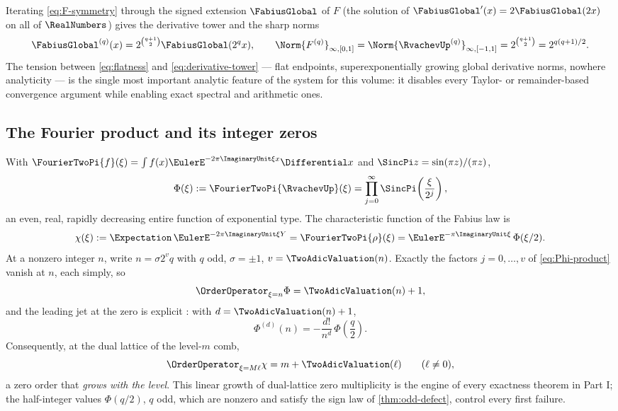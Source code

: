 Iterating \eqref{eq:F-symmetry} through the signed extension
$\FabiusGlobal$ of $F$ (the solution of $\FabiusGlobal'(x)=2\FabiusGlobal(2x)$ on
all of $\RealNumbers$) gives the derivative tower and the sharp norms
\begin{equation}
 \FabiusGlobal^{(q)}(x)=2^{\binom{q+1}{2}}\FabiusGlobal(2^qx),
 \qquad
 \Norm{F^{(q)}}_{\infty,[0,1]}
 =\Norm{\RvachevUp^{(q)}}_{\infty,[-1,1]}
 =2^{\binom{q+1}{2}}=2^{q(q+1)/2}.
 \label{eq:derivative-tower}
\end{equation}
The tension between \eqref{eq:flatness} and
\eqref{eq:derivative-tower} --- flat endpoints, superexponentially
growing global derivative norms, nowhere analyticity --- is the single
most important analytic feature of the system for this volume: it
disables every Taylor- or remainder-based convergence argument while
enabling exact spectral and arithmetic ones.

\subsection{The Fourier product and its integer zeros}
\label{sec:fourier}

With $\FourierTwoPi{f}(\xi)=\int f(x)\EulerE^{-2\pi\ImaginaryUnit\xi x}\Differential x$ and
$\SincPi z=\sin(\pi z)/(\pi z)$,
\begin{equation}
 \Phi(\xi):=\FourierTwoPi{\RvachevUp}(\xi)
 =\prod_{j=0}^{\infty}\SincPi\!\left(\frac{\xi}{2^j}\right),
 \label{eq:Phi-product}
\end{equation}
an even, real, rapidly decreasing entire function of exponential type.
The characteristic function of the Fabius law is
\begin{equation}
 \chi(\xi):=\Expectation\,\EulerE^{-2\pi\ImaginaryUnit\xi Y}
 =\FourierTwoPi{\rho}(\xi)
 =\EulerE^{-\pi\ImaginaryUnit\xi}\,\Phi(\xi/2).
 \label{eq:chi-Phi}
\end{equation}
At a nonzero integer $n$, write $n=\sigma2^{v}q$ with $q$ odd,
$\sigma=\pm1$, $v=\TwoAdicValuation(n)$.  Exactly the factors
$j=0,\dots,v$ of \eqref{eq:Phi-product} vanish at $n$, each simply, so
\begin{equation}
 \OrderOperator_{\xi=n}\Phi=\TwoAdicValuation(n)+1,
 \label{eq:Phi-zero-order}
\end{equation}
and the leading jet at the zero is explicit \cite{ProveItPrimary}:
with $d=\TwoAdicValuation(n)+1$,
\begin{equation}
 \Phi^{(d)}(n)
 =-\frac{d!}{n^{d}}\,\Phi\!\left(\frac q2\right).
 \label{eq:integer-leading-jet}
\end{equation}
Consequently, at the dual lattice of the level-$m$ comb,
\begin{equation}
 \OrderOperator_{\xi=M\ell}\chi=m+\TwoAdicValuation(\ell)
 \qquad(\ell\ne0),
 \label{eq:chi-zero-order}
\end{equation}
a zero order that \emph{grows with the level}.  This linear growth of
dual-lattice zero multiplicity is the engine of every exactness theorem
in Part I; the half-integer values $\Phi(q/2)$, $q$ odd, which are
nonzero and satisfy the sign law of \cref{thm:odd-defect}, control every
first failure.

